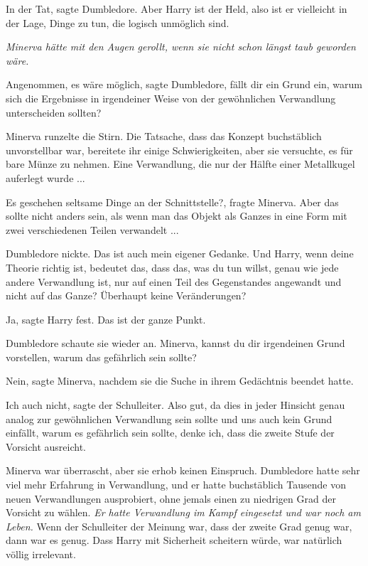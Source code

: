 \glqq{}In der Tat\grqq{}, sagte Dumbledore. \glqq{}Aber Harry ist der Held, also
ist er vielleicht in der Lage, Dinge zu tun, die logisch unmöglich sind.\grqq{}

\emph{Minerva hätte mit den Augen gerollt, wenn sie nicht schon längst taub
geworden wäre.}

\glqq{}Angenommen, es wäre möglich\grqq{}, sagte Dumbledore, \glqq{}fällt dir
ein Grund ein, warum sich die Ergebnisse in irgendeiner Weise von der
gewöhnlichen Verwandlung unterscheiden sollten?\grqq{}

Minerva runzelte die Stirn. Die Tatsache, dass das Konzept buchstäblich
unvorstellbar war, bereitete ihr einige Schwierigkeiten, aber sie versuchte, es
für bare Münze zu nehmen. Eine Verwandlung, die nur der Hälfte einer Metallkugel
auferlegt wurde ...

\glqq{}Es geschehen seltsame Dinge an der Schnittstelle?\grqq{}, fragte Minerva.
\glqq{}Aber das sollte nicht anders sein, als wenn man das Objekt als Ganzes in
eine Form mit zwei verschiedenen Teilen verwandelt ...\grqq{}

Dumbledore nickte. \glqq{}Das ist auch mein eigener Gedanke. Und Harry, wenn
deine Theorie richtig ist, bedeutet das, dass das, was du tun willst, genau wie
jede andere Verwandlung ist, nur auf einen Teil des Gegenstandes angewandt und
nicht auf das Ganze? Überhaupt keine Veränderungen?\grqq{}

\glqq{}Ja\grqq{}, sagte Harry fest. \glqq{}Das ist der ganze Punkt.\grqq{}

Dumbledore schaute sie wieder an. \glqq{}Minerva, kannst du dir irgendeinen
Grund vorstellen, warum das gefährlich sein sollte?\grqq{}

\glqq{}Nein\grqq{}, sagte Minerva, nachdem sie die Suche in ihrem Gedächtnis
beendet hatte.

\glqq{}Ich auch nicht\grqq{}, sagte der Schulleiter. \glqq{}Also gut, da dies in
jeder Hinsicht genau analog zur gewöhnlichen Verwandlung sein sollte und uns
auch kein Grund einfällt, warum es gefährlich sein sollte, denke ich, dass die
zweite Stufe der Vorsicht ausreicht.\grqq{}

Minerva war überrascht, aber sie erhob keinen Einspruch. Dumbledore hatte sehr
viel mehr Erfahrung in Verwandlung, und er hatte buchstäblich Tausende von neuen
Verwandlungen ausprobiert, ohne jemals einen zu niedrigen Grad der Vorsicht zu
wählen. \emph{Er hatte Verwandlung im Kampf eingesetzt und war noch am Leben.}
Wenn der Schulleiter der Meinung war, dass der zweite Grad genug war, dann war
es genug. Dass Harry mit Sicherheit scheitern würde, war natürlich völlig
irrelevant.

